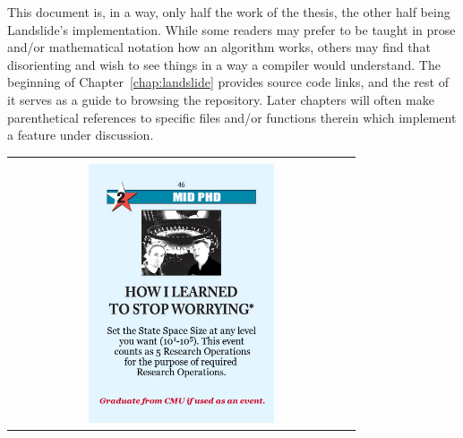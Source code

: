 This document is, in a way, only half the work of the thesis, the other half being Landslide's implementation.
While some readers may prefer to be taught in prose and/or mathematical notation how an algorithm works,
others may find that disorienting and wish to see things in a way a compiler would understand.
The beginning of Chapter~\ref{chap:landslide} provides source code links,
and the rest of it serves as a guide to browsing the repository.
Later chapters will often make parenthetical references to specific files and/or functions
therein which implement a feature under discussion.


\newpage
\thispagestyle{empty}
\begin{center}
\begin{tabular}{c}
\vspace{12em} \\
\includegraphics[width=0.55\textwidth]{how-i-learned.png}
\end{tabular}
\end{center}

